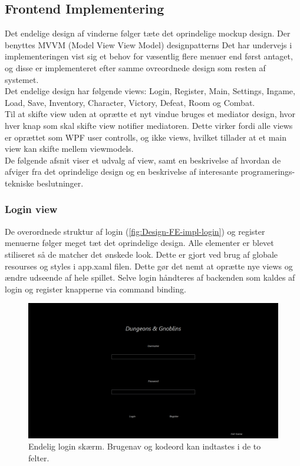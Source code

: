 \subsection{Frontend Implementering}

Det endelige design af vinderne følger tæte det oprindelige mockup design. Der benyttes MVVM (Model View View Model) designpatterns  Det har undervejs i implementeringen vist sig et behov for væsentlig flere menuer end først antaget, og disse er implementeret efter samme ovreordnede design som resten af systemet.\\
Det endelige design har følgende views: Login, Register, Main, Settings, Ingame, Load, Save, Inventory, Character, Victory, Defeat, Room og Combat.\\
Til at skifte view uden at oprætte et nyt vindue bruges et mediator design, hvor hver knap som skal skifte view notifier mediatoren. Dette virker fordi alle views er oprættet som WPF user controlls, og ikke views, hvilket tillader at et main view kan skifte mellem viewmodels.\\
De følgende afsnit viser et udvalg af view, samt en beskrivelse af hvordan de afviger fra det oprindelige design og en beskrivelse af interesante programerings-tekniske beslutninger.

\subsubsection{Login view}
De overordnede struktur af login (\autoref{fig:Design-FE-impl-login}) og register menuerne følger meget tæt det oprindelige design. Alle elementer er blevet stiliseret så de matcher det ønskede look. Dette er gjort ved brug af globale resourses og styles i app.xaml filen. Dette gør det nemt at oprætte nye views og ændre udseende af hele spillet. Selve login håndteres af backenden som kaldes af login og register knapperne via command binding.

\begin{figure}[h]
\centering
\includegraphics[width = \textwidth]{02-Body/Images/login_final.PNG}
\caption{Endelig login skærm. Brugenav og kodeord kan indtastes i de to felter.}
\label{fig:Design-FE-impl-login}
\end{figure}

